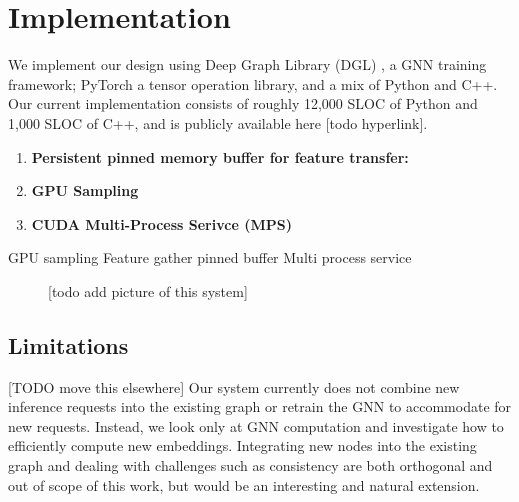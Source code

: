 \chapter{Implementation}
We implement our design using Deep Graph Library (DGL) \cite{DGL_2019}, a GNN training framework; PyTorch \cite{PyTorch_2019} a tensor operation library, and a mix of Python and C++.
Our current implementation consists of roughly 12,000 SLOC of Python and 1,000 SLOC of C++, and is publicly available here [todo hyperlink].



\begin{enumerate}
    \item \textbf{Persistent pinned memory buffer for feature transfer:}
    \item \textbf{GPU Sampling}
    \item \textbf{CUDA Multi-Process Serivce (MPS)}
\end{enumerate}


GPU sampling
Feature gather pinned buffer
Multi process service

\begin{figure}[h!]
    \centering
    
    \caption{[todo add picture of this system]}
    \label{Our system diagram}
\end{figure}    


\section{Limitations}
[TODO move this elsewhere]
Our system currently does not combine new inference requests into the existing graph or retrain the GNN to accommodate for new requests. 
Instead, we look only at GNN computation and investigate how to efficiently compute new embeddings. 
Integrating new nodes into the existing graph and dealing with challenges such as consistency are both orthogonal and out of scope of this work, but would be an interesting and natural extension.
